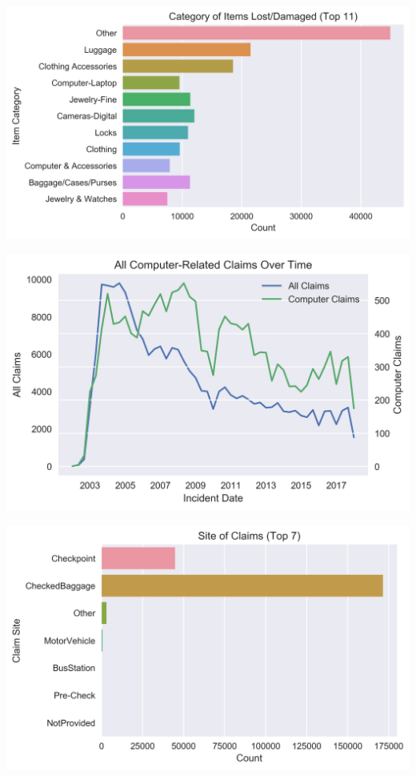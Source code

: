 \documentclass{beamer}
\begin{document}
\begin{frame}
	\includegraphics[keepaspectratio, width = \textwidth, height = \textheight]{../plots/items}
\end{frame}

\begin{frame}
	\includegraphics[keepaspectratio, width = \textwidth, height = \textheight]{../plots/computers}
\end{frame}

\begin{frame}
	\includegraphics[keepaspectratio, width = \textwidth, height = \textheight]{../plots/sites}
\end{frame}
\end{document}
